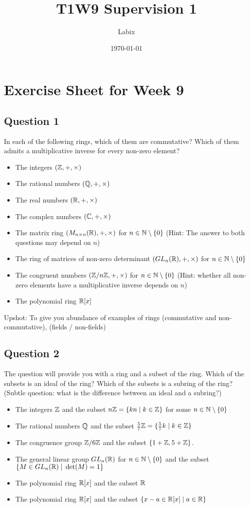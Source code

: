 \documentclass[a4paper]{article}
\title{T1W9 Supervision 1}
\author{Labix}
\date{\today}
\begin{document}
\section*{Exercise Sheet for Week 9}
\subsection*{Question 1}
In each of the following rings, which of them are commutative? Which of them admits a multiplicative inverse for every non-zero element? 
\begin{itemize}
\item The integers $(\mathbb{Z},+,\times)$
\item The rational numbers $(\mathbb{Q},+,\times)$
\item The real numbers $(\mathbb{R},+,\times)$
\item The complex numbers $(\mathbb{C},+,\times)$
\item The matrix ring $(M_{n\times n}(\mathbb{R}),+,\times)$ for $n\in\mathbb{N}\setminus\{0\}$ (Hint: The answer to both questions may depend on $n$)
\item The ring of matrices of non-zero determinant $(GL_n(\mathbb{R}),+,\times)$ for $n\in\mathbb{N}\setminus\{0\}$
\item The congruent numbers $(\mathbb{Z}/n\mathbb{Z},+,\times)$ for $n\in\mathbb{N}\setminus\{0\}$ (Hint: whether all non-zero elements have a multiplicative inverse depends on $n$)
\item The polynomial ring $\mathbb{R}[x]$
\end{itemize}

Upshot: To give you abundance of examples of rings (commutative and non-commutative), (fields / non-fields)

\subsection*{Question 2}
The question will provide you with a ring and a subset of the ring. Which of the subsets is an ideal of the ring? Which of the subsets is a subring of the ring? (Subtle question: what is the difference between an ideal and a subring?)

\begin{itemize}
\item The integers $\mathbb{Z}$ and the subset $n\mathbb{Z}=\{kn\;|\;k\in\mathbb{Z}\}$ for some $n\in\mathbb{N}\setminus\{0\}$
\item The rational numbers $\mathbb{Q}$ and the subset $\frac{5}{7}\mathbb{Z}=\{\frac{5}{7}k\;|\;k\in\mathbb{Z}\}$
\item The congruence group $\mathbb{Z}/6\mathbb{Z}$ and the subset $\{1+\mathbb{Z},5+\mathbb{Z}\}$. 
\item The general linear group $GL_n(\mathbb{R})$ for $n\in\mathbb{N}\setminus\{0\}$ and the subset $\{M\in GL_n(\mathbb{R})\;|\;\det(M)=1\}$
\item The polynomial ring $\mathbb{R}[x]$ and the subset $\mathbb{R}$
\item The polynomial ring $\mathbb{R}[x]$ and the subset $\{x-a\in\mathbb{R}[x]\;|\;a\in\mathbb{R}\}$
\end{itemize}
\end{document}
